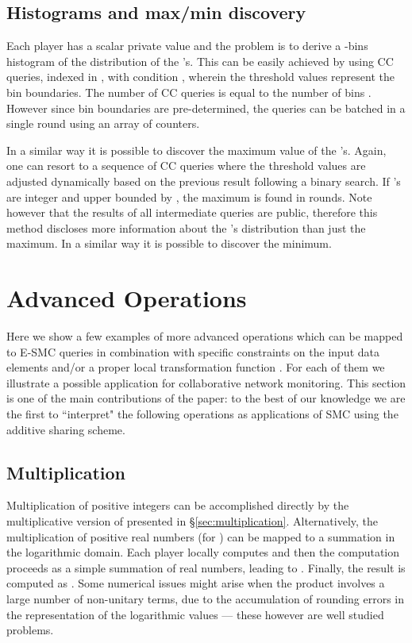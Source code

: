 \documentclass{sig-alternate}
\begin{document}
 \subsection{Histograms and max/min discovery}\label{sec:binhist}
Each player  has a scalar private value   
and the problem is to derive a -bins histogram of the distribution of the 's. This can be easily achieved 
by using  CC queries, indexed in , with condition , wherein the threshold values  represent the bin boundaries. 
The number of CC queries is equal to the number of bins . However since bin boundaries are pre-determined, the queries can be batched in a single round using an array of  counters. 


In a similar way it is possible to discover the maximum value of the 's.
Again, one can resort to a sequence of  CC queries where the threshold values  are adjusted dynamically based on the previous result following a binary search.  If 's are integer and upper bounded by , the maximum is found in  rounds. 
Note however that the results of all intermediate queries are public, therefore this method discloses more information about the 's distribution than just the maximum. 
In a similar way it is possible to discover the minimum. 


\section{Advanced Operations}\label{sec:operations-advanced}

Here we show a few examples of more advanced operations which can be mapped to E-SMC queries in combination with specific constraints on the input data elements and/or a proper local transformation function . 
For each of them we illustrate a possible application for  collaborative network monitoring.
This section is one of the main contributions of the paper: to the best of our knowledge we are the first to ``interpret" the following operations as applications of SMC using the additive sharing scheme. 


\subsection{Multiplication}Multiplication of positive integers can be accomplished directly by the multiplicative version of \ata presented in \S \ref{sec:multiplication}.
Alternatively, 
the multiplication of positive real numbers  (for )  can be mapped to a summation in  the logarithmic domain. Each player locally computes  
and then the computation proceeds as a simple summation of real numbers, leading to . Finally, the result is computed as . 
Some numerical issues might arise when the product involves a large number of non-unitary terms, due to the accumulation of rounding errors in the representation of the logarithmic values --- these however are well studied problems. 
\end{document}
